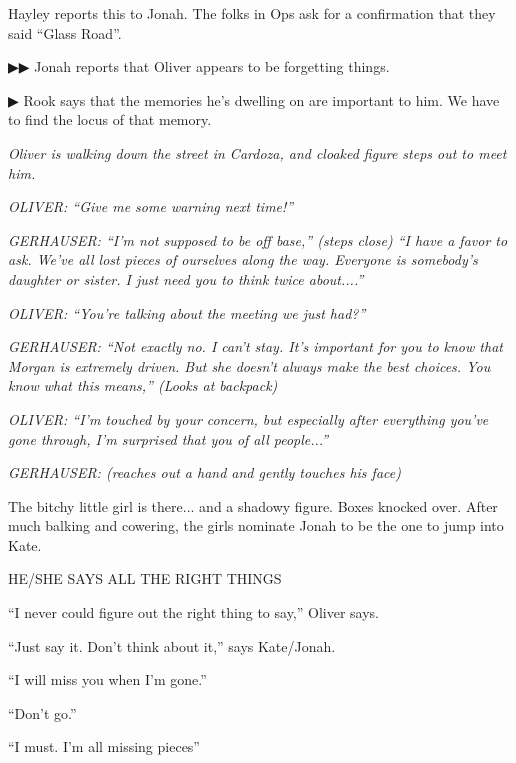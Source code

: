   Hayley reports this to Jonah.  The folks in Ops ask for a confirmation that they said ``Glass Road''. 

 {\color[RGB]{68,68,68}▶▶ } Jonah reports that Oliver appears to be forgetting things.

 {\color[RGB]{68,68,68}▶ } Rook says that the memories he's dwelling on are important to him.  We have to find the locus of that memory.








\textit{Oliver is walking down the street in Cardoza, and cloaked figure steps out to meet him.}

\textit{OLIVER: ``Give me some warning next time!''}

\textit{GERHAUSER: ``I'm not supposed to be off base,'' (steps close) ``I have a favor to ask.  We've all lost pieces of ourselves along the way.  Everyone is somebody's daughter or sister.  I just need you to think twice about....''}

\textit{OLIVER: ``You're talking about the meeting we just had?''}

\textit{GERHAUSER: ``Not exactly no.  I can't stay.  It's important for you to know that Morgan is extremely driven.  But she doesn't always make the best choices.  You know what this means,'' (Looks at backpack)}

\textit{OLIVER: ``I'm touched by your concern, but especially after everything you've gone through, I'm surprised that you of all people...''}

\textit{GERHAUSER: (reaches out a hand and gently touches his face) }



The bitchy little girl is there... and a shadowy figure.  Boxes knocked over. After much balking and cowering, the girls nominate Jonah to be the one to jump into Kate.

HE/SHE SAYS ALL THE RIGHT THINGS

``I never could figure out the right thing to say,'' Oliver says.

``Just say it.  Don't think about it,'' says Kate/Jonah.

``I will miss you when I'm gone.''

``Don't go.''

``I must.  I'm all missing pieces''

